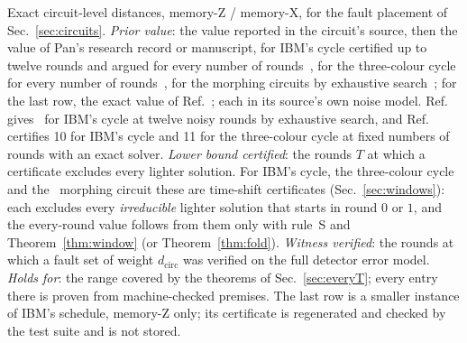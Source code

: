 \documentclass[aps,pra,twocolumn,superscriptaddress,nofootinbib,longbibliography,floatfix]{revtex4-2}
\newcommand{\dc}{d_{\mathrm{circ}}}
\begin{document}
\begin{table}[tbp]
\caption{Exact circuit-level distances, memory-Z / memory-X, for the fault placement of Sec.~\ref{sec:circuits}. \emph{Prior value}: the value reported in the circuit's source, then the value of Pan's research record or manuscript, for IBM's cycle certified up to twelve rounds and argued for every number of rounds~\cite{pan2026e037,pan2026e043,pan2026e045}, for the three-colour cycle for every number of rounds~\cite{pan2026interleaving}, for the morphing circuits by exhaustive search~\cite{pan2026e019,pan2026e017}; for the last row, the exact value of Ref.~\cite{beni2025tesseract}; each in its source's own noise model. Ref.~\cite{crocker2026gross} gives \IbmD\ for IBM's cycle at twelve noisy rounds by exhaustive search, and Ref.~\cite{cheng2026certifying} certifies 10 for IBM's cycle and 11 for the three-colour cycle at fixed numbers of rounds with an exact solver. \emph{Lower bound certified}: the rounds $T$ at which a certificate excludes every lighter solution. For IBM's cycle, the three-colour cycle and the \SmallCode\ morphing circuit these are time-shift certificates (Sec.~\ref{sec:windows}): each excludes every \emph{irreducible} lighter solution that starts in round $0$ or $1$, and the every-round value follows from them only with rule~S and Theorem~\ref{thm:window} (or Theorem~\ref{thm:fold}). \emph{Witness verified}: the rounds at which a fault set of weight $\dc$ was verified on the full detector error model. \emph{Holds for}: the range covered by the theorems of Sec.~\ref{sec:everyT}; every entry there is proven from machine-checked premises. The last row is a smaller instance of IBM's schedule, memory-Z only; its certificate is regenerated and checked by the test suite and is not stored.}
\label{tab:summary}

\end{table}
\end{document}
